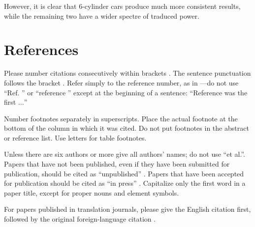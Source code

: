 \documentclass[conference]{IEEEtran}
\begin{document}
However, it is clear that 6-cylinder cars produce much more consistent results, while the remaining two have a wider spectre of traduced power.



























\section*{References}

Please number citations consecutively within brackets \cite{b1}. The 
sentence punctuation follows the bracket \cite{b2}. Refer simply to the reference 
number, as in \cite{b3}---do not use ``Ref. \cite{b3}'' or ``reference \cite{b3}'' except at 
the beginning of a sentence: ``Reference \cite{b3} was the first $\ldots$''

Number footnotes separately in superscripts. Place the actual footnote at 
the bottom of the column in which it was cited. Do not put footnotes in the 
abstract or reference list. Use letters for table footnotes.

Unless there are six authors or more give all authors' names; do not use 
``et al.''. Papers that have not been published, even if they have been 
submitted for publication, should be cited as ``unpublished'' \cite{b4}. Papers 
that have been accepted for publication should be cited as ``in press'' \cite{b5}. 
Capitalize only the first word in a paper title, except for proper nouns and 
element symbols.

For papers published in translation journals, please give the English 
citation first, followed by the original foreign-language citation \cite{b6}.
\end{document}

